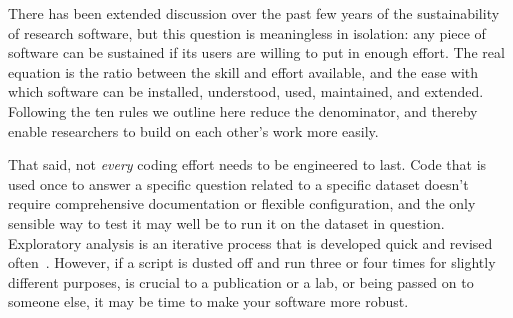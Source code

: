 \documentclass[10pt,letterpaper]{article}
\begin{document}
There has been extended discussion over the past few years of the
sustainability of research software, but this question is meaningless
in isolation: any piece of software can be sustained if its users are
willing to put in enough effort.  The real equation is the ratio
between the skill and effort available, and the ease with which
software can be installed, understood, used, maintained, and extended.
Following the ten rules we outline here reduce the denominator, and
thereby enable researchers to build on each other's work more easily.

That said, not \emph{every} coding effort needs to be engineered to
last.  Code that is used once to answer a specific question related to
a specific dataset doesn't require comprehensive documentation or
flexible configuration, and the only sensible way to test it may well
be to run it on the dataset in question. Exploratory analysis is an
iterative process that is developed quick and revised
often~\cite{lawlor2015,sanders2008}.  However, if a script is dusted
off and run three or four times for slightly different purposes, is
crucial to a publication or a lab, or being passed on to someone else,
it may be time to make your software more robust.


\end{document}
